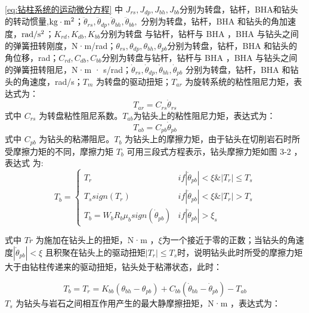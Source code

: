 \documentclass[12pt,hyperref,a4paper,UTF8]{ctexart}
\begin{document}
	\autoref{eq:钻柱系统的运动微分方程} 中 $J_{rs}, J_{dp}, J_{bh},J_{bb}$分别为转盘，钻杆，BHA和钻头的转动惯量,${\rm{kg}} \cdot {{\rm{m}}^{\rm{2}}}$；${\ddot \theta }_{rs}, {\ddot \theta }_{dp}, {\ddot \theta }_{bh}, {\ddot \theta }_{bb}, $ 分别为转盘，钻杆，BHA 和钻头的角加速度，${\rm{rad/}}{{\rm{s}}^2}$；$K_{rd}, K_{db}, K_{bb}$分别为转盘 与钻杆，钻杆与 BHA ，BHA 与钻头之间的弹簧扭转刚度，N·m/rad；$\theta_{rs}, \theta_{dp}, \theta_{bh}, \theta_{pb}$分别为转盘，钻杆，BHA 和钻头的角位移，rad；$C_{rd} , C_{db}, C_{bb}$分别为转盘与钻杆，钻杆与 BHA ，BHA 与钻头之间的弹簧扭转阻尼，N·m · s/rad；$\dot \theta_{rs}, \dot \theta_{dp}, \dot \theta_{bh}, \dot \theta_{pb}$ 分别为转盘，钻杆，BHA 和钻头的角速度，rad/s；$T_m$ 为转盘的驱动扭矩；$T_{ar}$ 为旋转系统的粘性阻尼力矩，表达式为：
	\begin{equation}
		{T_{ar}} = {C_{rs}}{{\dot \theta }_{rs}}
	\end{equation}
	式中 $C_{rs}$ 为转盘粘性阻尼系数。$T_{ab}$为钻头上的粘性阻尼力矩，表达式为：
	\begin{equation}
		{T_{ab}} = {C_{pb}}{{\dot \theta }_{pb}}
	\end{equation}
	式中 $C_{pb}$ 为钻头的粘滞阻尼。$T_b$ 为钻头上的摩擦力矩，由于钻头在切削岩石时所 受摩擦力矩的不同，摩擦力矩 $T_b$ 可用三段式方程表示，钻头摩擦力矩如图 3-2 ，表达式 为:                                  
	\begin{equation}
		{T_b} = \left\{ {\begin{array}{*{20}{l}}
				{{T_r}}&{if\left| {{{\dot \theta }_{pb}}} \right| < \xi \& \left| {{T_r}} \right| \le {T_s}}\\
				{{T_s}sign({T_r})}&{if\left| {{{\dot \theta }_{pb}}} \right| < \xi \& \left| {{T_r}} \right| > {T_s}}\\
				{{T_b} = {W_b}{R_b}{\mu _b}sign({{\dot \theta }_{pb}})}&{if\left| {{{\dot \theta }_{pb}}} \right| > {\xi _s}}
		\end{array}} \right.
	\end{equation}
	
	式中 $Tr$ 为施加在钻头上的扭矩，N·m ，$\xi$为一个接近于零的正数；当钻头的角速度${\left| {{{\dot \theta }_{pb}}} \right|} < \xi $  且积聚在钻头上的驱动扭矩${\left| {{T_r}} \right| }\le {T_s}$时，说明钻头此时所受的摩擦力矩大于由钻柱传递来的驱动扭矩，钻头处于粘滞状态，此时：
	
	\begin{equation}
		{T_b} = {T_r} = {K_{bb}}({\theta _{bh}} - {\theta _{pb}}) + {C_{bb}}({{\dot \theta }_{bh}} - {{\dot \theta }_{pb}}) - {T_{ab}}
	\end{equation}
	$T_s$ 为钻头与岩石之间相互作用产生的最大静摩擦扭矩，N·m ，表达式为： 
	
\end{document}
